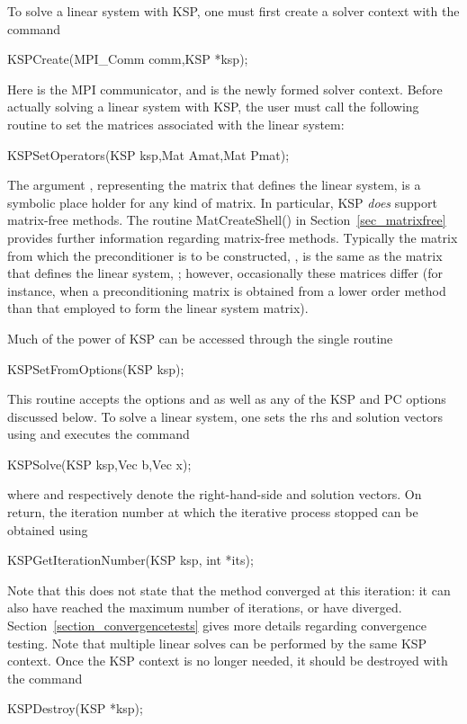 To solve a linear system with KSP, one must first create a solver context
with the command
\begin{tabbing}
  KSPCreate(MPI\_Comm comm,KSP *ksp);
\end{tabbing}
Here  is the MPI communicator, and  is the newly
formed solver context.
Before actually solving a linear system with KSP, the user must call
the following routine to set the matrices associated with the linear
system:
\begin{tabbing}
  KSPSetOperators(KSP ksp,Mat Amat,Mat Pmat);
\end{tabbing}
The argument , representing the matrix that defines the
linear system, is a symbolic place holder for any kind of matrix.
In particular, KSP {\em does} support matrix-free methods.
The routine MatCreateShell()
in Section~\ref{sec_matrixfree} provides further information regarding
matrix-free methods.
Typically the matrix from which the
preconditioner is to be constructed, , is the same as
the matrix that defines the linear system, ; however,
occasionally these matrices differ (for instance, 
when a preconditioning matrix is obtained from a lower order method than
that employed to form the linear system matrix).

Much of the power of KSP can be accessed through the single routine
\begin{tabbing}
  KSPSetFromOptions(KSP ksp);
\end{tabbing}
This
routine accepts the options  and  as well as
any of the KSP and PC options discussed below.
To solve a linear system, one sets the rhs and solution vectors using
and executes the
command
\begin{tabbing}
  KSPSolve(KSP ksp,Vec b,Vec x);
\end{tabbing}
where  and  respectively denote the right-hand-side and
solution vectors.  On return, the iteration number at which
the iterative process stopped
%
can be obtained using
\begin{tabbing}
  KSPGetIterationNumber(KSP ksp, int *its);
\end{tabbing}
Note that this does not state that the method converged at this
iteration: it can also have reached the maximum number of iterations,
or have diverged.
%
Section~\ref{section_convergencetests} gives more details regarding
convergence testing. Note that multiple linear solves can be performed by
the same KSP context. Once the KSP context is no longer needed, it should be
destroyed with the command
\begin{tabbing}
  KSPDestroy(KSP *ksp);
\end{tabbing}


